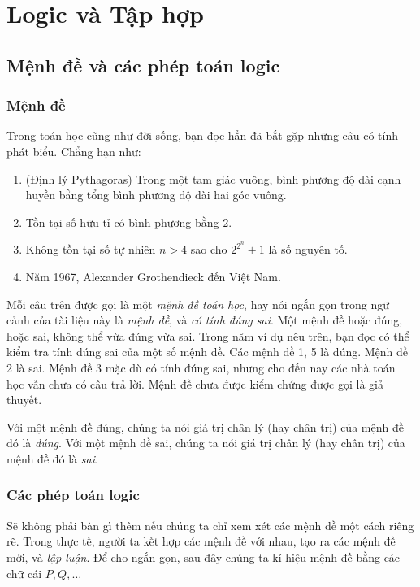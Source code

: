 \chapter{Logic và Tập hợp}\label{chapter1:logic-and-set-theory}

\section{Mệnh đề và các phép toán logic}

\subsection*{Mệnh đề}

Trong toán học cũng như đời sống, bạn đọc hẳn đã bắt gặp những câu có tính phát biểu. Chẳng hạn như:

\begin{enumerate}[label={(\arabic*)}]
    \item (Định lý Pythagoras) Trong một tam giác vuông, bình phương độ dài cạnh huyền bằng tổng bình phương độ dài hai góc vuông.
    \item Tồn tại số hữu tỉ có bình phương bằng $2$.
    \item Không tồn tại số tự nhiên $n > 4$ sao cho $2^{2^{n}} + 1$ là số nguyên tố.
    \item Năm 1967, Alexander Grothendieck đến Việt Nam.
\end{enumerate}

Mỗi câu trên được gọi là một \textit{mệnh đề toán học}, hay nói ngắn gọn trong ngữ cảnh của tài liệu này là \textit{mệnh đề}, và \textit{có tính đúng sai}. Một mệnh đề hoặc đúng, hoặc sai, không thể vừa đúng vừa sai. Trong năm ví dụ nêu trên, bạn đọc có thể kiểm tra tính đúng sai của một số mệnh đề. Các mệnh đề 1, 5 là đúng. Mệnh đề 2 là sai. Mệnh đề 3 mặc dù có tính đúng sai, nhưng cho đến nay các nhà toán học vẫn chưa có câu trả lời. Mệnh đề chưa được kiểm chứng được gọi là giả thuyết.

Với một mệnh đề đúng, chúng ta nói giá trị chân lý (hay chân trị) của mệnh đề đó là \textit{đúng}. Với một mệnh đề sai, chúng ta nói giá trị chân lý (hay chân trị) của mệnh đề đó là \textit{sai}.

\subsection*{Các phép toán logic}

Sẽ không phải bàn gì thêm nếu chúng ta chỉ xem xét các mệnh đề một cách riêng rẽ. Trong thực tế, người ta kết hợp các mệnh đề với nhau, tạo ra các mệnh đề mới, và \textit{lập luận}. Để cho ngắn gọn, sau đây chúng ta kí hiệu mệnh đề bằng các chữ cái $P, Q,\ldots$

